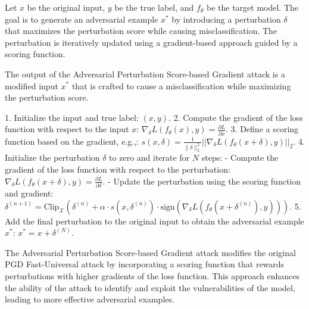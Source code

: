 Let \( x \) be the original input, \( y \) be the true label, and \( f_{\theta} \) be the target model. The goal is to generate an adversarial example \( x^* \) by introducing a perturbation \( \delta \) that maximizes the perturbation score while causing misclassification. The perturbation is iteratively updated using a gradient-based approach guided by a scoring function.



The output of the Adversarial Perturbation Score-based Gradient attack is a modified input $x^*$ that is crafted to cause a misclassification while maximizing the perturbation score.

1. Initialize the input and true label:
   $
   (x, y).
   $
2. Compute the gradient of the loss function with respect to the input $x$:
   $
   \nabla_\delta L(f_{\theta}(x), y) = \frac{\partial L}{\partial x}.
   $
3. Define a scoring function based on the gradient, e.g.,:
   $
   s(x, \delta) = \frac{1}{\|\delta\|_2^2} ||\nabla_\delta L(f_{\theta}(x + \delta), y)||_2.
   $
4. Initialize the perturbation $\delta$ to zero and iterate for $N$ steps:
   - Compute the gradient of the loss function with respect to the perturbation:
     $
     \nabla_\delta L(f_{\theta}(x + \delta), y) = \frac{\partial L}{\partial \delta}.
     $
   - Update the perturbation using the scoring function and gradient:
     $
     \delta^{(n+1)} = \text{Clip}_{\mathcal{X}} (\delta^{(n)} + \alpha \cdot s(x, \delta^{(n)}) \cdot \text{sign}(\nabla_\delta L(f_{\theta}(x + \delta^{(n)}), y))).
     $
5. Add the final perturbation to the original input to obtain the adversarial example $x^*$:
   $
   x^* = x + \delta^{(N)}.
   $

The Adversarial Perturbation Score-based Gradient attack modifies the original PGD Fast-Universal attack by incorporating a scoring function that rewards perturbations with higher gradients of the loss function. This approach enhances the ability of the attack to identify and exploit the vulnerabilities of the model, leading to more effective adversarial examples.